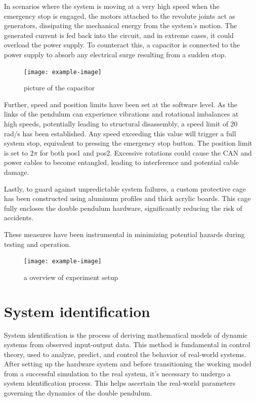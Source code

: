In scenarios where the system is moving at a very high speed when the emergency stop is engaged, the motors attached to the revolute joints act as generators, dissipating the mechanical energy from the system's motion. The generated current is fed back into the circuit, and in extreme cases, it could overload the power supply. To counteract this, a capacitor is connected to the power supply to absorb any electrical surge resulting from a sudden stop.

\begin{figure}[htbp]
    \centering
    \texttt{[image: example-image]}
    \caption{picture of the capacitor}
    \label{fig:example_figure}
\end{figure}

Further, speed and position limits have been set at the software level. As the links of the pendulum can experience vibrations and rotational imbalances at high speeds, potentially leading to structural disassembly, a speed limit of 20 rad/s has been established. Any speed exceeding this value will trigger a full system stop, equivalent to pressing the emergency stop button. The position limit is set to \(2\pi\) for both pos1 and pos2. Excessive rotations could cause the CAN and power cables to become entangled, leading to interference and potential cable damage.

Lastly, to guard against unpredictable system failures, a custom protective cage has been constructed using aluminum profiles and thick acrylic boards. This cage fully encloses the double pendulum hardware, significantly reducing the risk of accidents.

These measures have been instrumental in minimizing potential hazards during testing and operation.

\begin{figure}[htbp]
    \centering
    \texttt{[image: example-image]}
    \caption{a overview of experiment setup}
    \label{fig:example_figure}
\end{figure}

\section{System identification}
System identification is the process of deriving mathematical models of dynamic systems from observed input-output data. This method is fundamental in control theory, used to analyze, predict, and control the behavior of real-world systems. After setting up the hardware system and before transitioning the working model from a successful simulation to the real system, it's necessary to undergo a system identification process. This helps ascertain the real-world parameters governing the dynamics of the double pendulum.

